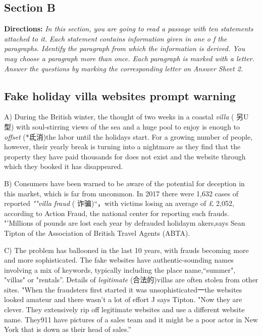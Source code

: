 \documentclass[UTF8,11pt]{ctexart}
\begin{document}
\subsection*{\textbf{Section B}}


\textbf{Directions: }\textit{In this section, you are going to read a passage with ten statements attached to it.} \textit{Each statement contains information given in one o f the paragraphs. Identify the paragraph} \textit{from which the information is derived. You may choose a paragraph more than once. Each} \textit{paragraph is marked with a letter. Answer the questions by marking the corresponding letter on} \textit{Answer Sheet 2.}


\subsection*{\textbf{Fake holiday villa websites prompt warning}}


A) During the British winter, the thought of two weeks in a coastal \textit{villa} ( 另U 型) with soul-stirring views of the sea and a huge pool to enjoy is enough to \textit{offset} (*氐消)the labor until the holidays start. For a growing number of people, however, their yearly break is turning into a nightmare as they find that the property they have paid thousands for does not exist and the website through which they booked it has disappeared.


B) Consumers have been warned to be aware of the potential for deception in this market, which is far from uncommon. In 2017 there were 1,632 cases of reported \textit{""villa fraud} ( 诈骗)“，with victims losing an average of £ 2,052, according to Action Fraud, the national center for reporting such frauds. "'Millions of pounds are lost each year by defrauded holidaym akers,says Sean Tipton of the Association of British Travel Agents (ABTA).


C) The problem has ballooned in the last 10 years, with frauds becoming more and more sophisticated. The fake websites have authentic-sounding names involving a mix of keywords, typically including the place name,“summer", "villas" or "rentals”. Details of \textit{legitimate} (合法的)villas are often stolen from other sites. "When the fraudsters first started it was unsophisticated一the websites looked amateur and there wasn't a lot of effort J says Tipton. "Now they are clever. They extensively rip off legitimate websites and use a different website name. They911 have pictures of a sales team and it might be a poor actor in New York that is down as their head of sales.”
\end{document}
